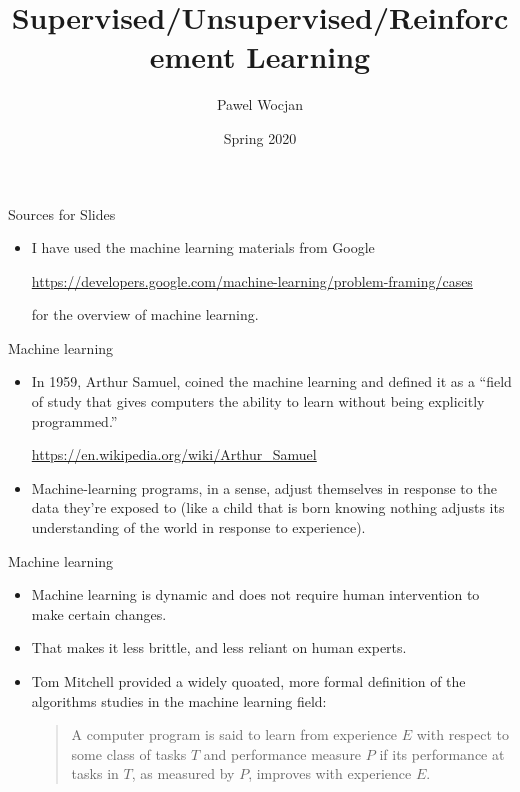 \documentclass{beamer}
\title[AI]{Supervised/Unsupervised/Reinforcement Learning}
\author{Pawel Wocjan}
\institute{University of Central Florida}
\date{Spring 2020}
\begin{document}
\begin{frame}
  \titlepage
\end{frame}

\begin{frame}{Sources for Slides}

\begin{itemize}
\item I have used the machine learning materials from Google

{\small 
\url{https://developers.google.com/machine-learning/problem-framing/cases}
}

for the overview of machine learning.
\end{itemize}
\end{frame}


\begin{frame}{Machine learning}
\begin{itemize}
\item In 1959, Arthur Samuel, coined the machine learning and defined it as a ``field of study that gives computers the ability to learn without being explicitly programmed.''

\url{https://en.wikipedia.org/wiki/Arthur_Samuel}

\item Machine-learning programs, in a sense, adjust themselves in response to the data they’re exposed to (like a child that is born knowing nothing adjusts its understanding of the world in response to experience).
\end{itemize}
\end{frame}

\begin{frame}{Machine learning}

\begin{itemize}
\item Machine learning is dynamic and does not require human intervention to make certain changes. 

\item That makes it less brittle, and less reliant on human experts.

\item Tom Mitchell provided a widely quoated, more formal definition of the algorithms studies in the machine learning field:

\medskip
\begin{quote}
A computer program is said to learn from experience $E$ with respect to some class of tasks $T$ and performance measure $P$ if its performance at tasks in $T$, as measured by $P$, improves with experience $E$.
\end{quote}
\end{itemize}

\end{frame}
\end{document}
